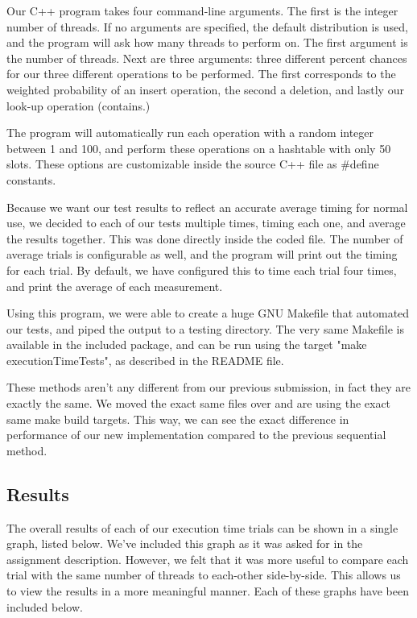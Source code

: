 \documentclass[journal]{IEEEtran}
\begin{document}
Our C++ program takes four command-line arguments. The first is the integer number of threads. If no arguments are specified, the default distribution is used, and the program will ask how many threads to perform on. The first argument is the number of threads. Next are three arguments: three different percent chances for our three different operations to be performed. The first corresponds to the weighted probability of an insert operation, the second a deletion, and lastly our look-up operation (contains.)

The program will automatically run each operation with a random integer between 1 and 100, and perform these operations on a hashtable with only 50 slots. These options are customizable inside the source C++ file as \#define constants.

Because we want our test results to reflect an accurate average timing for normal use, we decided to each of our tests multiple times, timing each one, and average the results together. This was done directly inside the coded file. The number of average trials is configurable as well, and the program will print out the timing for each trial. By default, we have configured this to time each trial four times, and print the average of each measurement.

Using this program, we were able to create a huge GNU Makefile that automated our tests, and piped the output to a testing directory. The very same Makefile is available in the included package, and can be run using the target "make executionTimeTests", as described in the README file.

These methods aren't any different from our previous submission, in fact they are exactly the same. We moved the exact same files over and are using the exact same make build targets. This way, we can see the exact difference in performance of our new implementation compared to the previous sequential method.

\subsection{Results}

The overall results of each of our execution time trials can be shown in a single graph, listed below. We've included this graph as it was asked for in the assignment description. However, we felt that it was more useful to compare each trial with the same number of threads to each-other side-by-side. This allows us to view the results in a more meaningful manner. Each of these graphs have been included below.
\end{document}
